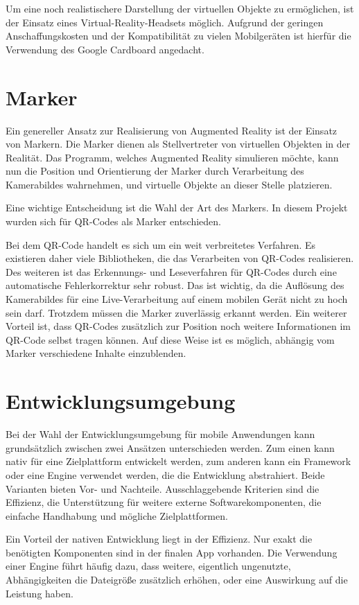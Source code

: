 Um eine noch realistischere Darstellung der virtuellen Objekte zu ermöglichen, ist der Einsatz eines Virtual-Reality-Headsets möglich. Aufgrund der geringen Anschaffungskosten und der Kompatibilität zu vielen Mobilgeräten ist hierfür die Verwendung des Google Cardboard angedacht.

\section{Marker}
Ein genereller Ansatz zur Realisierung von Augmented Reality ist der Einsatz von Markern. Die Marker dienen als Stellvertreter von virtuellen Objekten in der Realität. Das Programm, welches Augmented Reality simulieren möchte, kann nun die Position und Orientierung der Marker durch Verarbeitung des Kamerabildes wahrnehmen, und virtuelle Objekte an dieser Stelle platzieren.

Eine wichtige Entscheidung ist die Wahl der Art des Markers. In diesem Projekt wurden sich für QR-Codes als Marker entschieden.

Bei dem QR-Code handelt es sich um ein weit verbreitetes Verfahren. Es existieren daher viele Bibliotheken, die das Verarbeiten von QR-Codes realisieren. Des weiteren ist das Erkennungs- und Leseverfahren für QR-Codes durch eine automatische Fehlerkorrektur sehr robust. Das ist wichtig, da die Auflösung des Kamerabildes für eine Live-Verarbeitung auf einem mobilen Gerät nicht zu hoch sein darf. Trotzdem müssen die Marker zuverlässig erkannt werden. Ein weiterer Vorteil ist, dass QR-Codes zusätzlich zur Position noch weitere Informationen im QR-Code selbst tragen können. Auf diese Weise ist es möglich, abhängig vom Marker verschiedene Inhalte einzublenden.

\section{Entwicklungsumgebung}
Bei der Wahl der Entwicklungsumgebung für mobile Anwendungen kann grundsätzlich zwischen zwei Ansätzen unterschieden werden. Zum einen kann nativ für eine Zielplattform entwickelt werden, zum anderen kann ein Framework oder eine Engine verwendet werden, die die Entwicklung abstrahiert. Beide Varianten bieten Vor- und Nachteile. Ausschlaggebende Kriterien sind die Effizienz, die Unterstützung für weitere externe Softwarekomponenten, die einfache Handhabung und mögliche Zielplattformen.

Ein Vorteil der nativen Entwicklung liegt in der Effizienz. Nur exakt die benötigten Komponenten sind in der finalen App vorhanden. Die Verwendung einer Engine führt häufig dazu, dass weitere, eigentlich ungenutzte, Abhängigkeiten die Dateigröße zusätzlich erhöhen, oder eine Auswirkung auf die Leistung haben.

